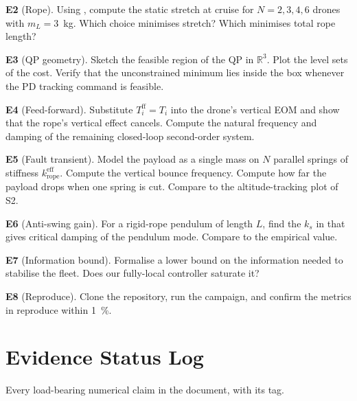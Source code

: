 \documentclass[11pt,a4paper,oneside]{report}
\newcommand{\rope}{\text{rope}}
\newcommand{\R}{\mathbb{R}}
\begin{document}
\textbf{E2} (Rope). Using , compute the static stretch
at cruise for $N=2,3,4,6$ drones with $m_L=3$~kg. Which choice
minimises stretch? Which minimises total rope length?

\textbf{E3} (QP geometry). Sketch the feasible region of the QP
 in $\R^3$. Plot the level sets of the cost. Verify that
the unconstrained minimum lies inside the box whenever the PD
tracking command is feasible.

\textbf{E4} (Feed-forward). Substitute $T_i^\text{ff} = T_i$ into the
drone's vertical EOM  and show that the rope's
vertical effect cancels. Compute the natural frequency and damping
of the remaining closed-loop second-order system.

\textbf{E5} (Fault transient). Model the payload as a single mass on
$N$ parallel springs of stiffness $k_\rope^\text{eff}$. Compute the
vertical bounce frequency. Compute how far the payload drops when
one spring is cut. Compare to the altitude-tracking plot of S2.

\textbf{E6} (Anti-swing gain). For a rigid-rope pendulum of length
$L$, find the $k_s$ in  that gives critical
damping of the pendulum mode. Compare to the empirical value.

\textbf{E7} (Information bound). Formalise a lower bound on the
information needed to stabilise the fleet. Does our fully-local
controller saturate it?

\textbf{E8} (Reproduce). Clone the repository, run the campaign, and
confirm the metrics in  reproduce within 1~\%.

\chapter{Evidence Status Log}
\label{chap:evidence}

Every load-bearing numerical claim in the document, with its tag.
\end{document}
